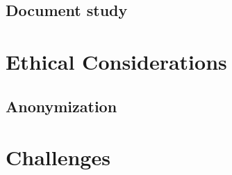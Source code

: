 \subsection{Document study}

\section{Ethical Considerations}
\subsection{Anonymization}

\section{Challenges}